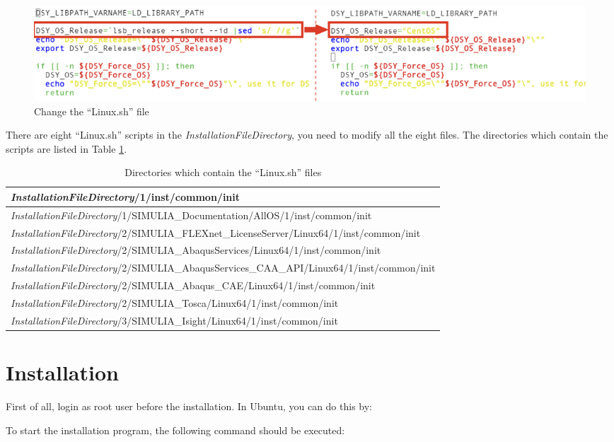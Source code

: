 \documentclass[12pt]{article}
\newcommand{\ifp}{\textit{InstallationFileDirectory}}
\newcommand{\cmd}[1]{
    \leavevmode{\parindent=0.05\textwidth\indent
    \begin{tabular}{>{\columncolor[gray]{0.8}}p{0.95\textwidth}}
        #1
    \end{tabular}
    }
}
\begin{document}
\begin{figure}[h!]
\begin{center}
    \includegraphics[width=\textwidth]{Figures/FakeLinux.png}
\end{center}
\caption{Change the ``Linux.sh'' file}
\label{fig-2}
\end{figure}

There are eight ``Linux.sh'' scripts in the \ifp, you need to modify all the eight files. The directories which contain the scripts are listed in Table \ref{tb-2}.

\begin{table}[h!]
\caption{Directories which contain the ``Linux.sh'' files}
\begin{center}
\begin{tabular}{l}
    \hline
    \ifp/1/inst/common/init \\
    \hline
    \ifp/1/SIMULIA\_Documentation/AllOS/1/inst/common/init \\
    \hline
    \ifp/2/SIMULIA\_FLEXnet\_LicenseServer/Linux64/1/inst/common/init \\
    \hline
    \ifp/2/SIMULIA\_AbaqusServices/Linux64/1/inst/common/init \\
    \hline
    \ifp/2/SIMULIA\_AbaqusServices\_CAA\_API/Linux64/1/inst/common/init \\
    \hline
    \ifp/2/SIMULIA\_Abaqus\_CAE/Linux64/1/inst/common/init \\
    \hline
    \ifp/2/SIMULIA\_Tosca/Linux64/1/inst/common/init \\
    \hline
    \ifp/3/SIMULIA\_Isight/Linux64/1/inst/common/init \\
    \hline
\end{tabular}
\end{center}
\label{tb-2}
\end{table}

\section*{Installation}
First of all, login as root user before the installation. In Ubuntu, you can do this by:

\cmd{sudo -s}

To start the installation program, the following command should be executed:
\end{document}
